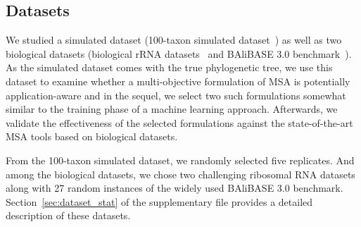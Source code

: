 \subsection{Datasets}
We studied a simulated dataset (100-taxon simulated dataset~\citep{liu2009rapid}) as well as two biological datasets (biological rRNA datasets~\citep{liu2009rapid} and BAliBASE 3.0 benchmark~\citep{thompson2005balibase}). As the simulated dataset comes with the true phylogenetic tree, we use this dataset to examine whether a multi-objective formulation of MSA is potentially application-aware and in the sequel, we select two such formulations somewhat similar to the training phase of a machine learning approach. Afterwards, we validate the effectiveness of the selected formulations against the state-of-the-art MSA tools based on biological datasets.  

From the 100-taxon simulated dataset, we randomly selected five replicates. And among the biological datasets, we chose two challenging ribosomal RNA datasets along with 27 random instances of the widely used BAliBASE 3.0 benchmark. Section~\ref{sec:dataset_stat} of the supplementary file provides a detailed description of these datasets. 


